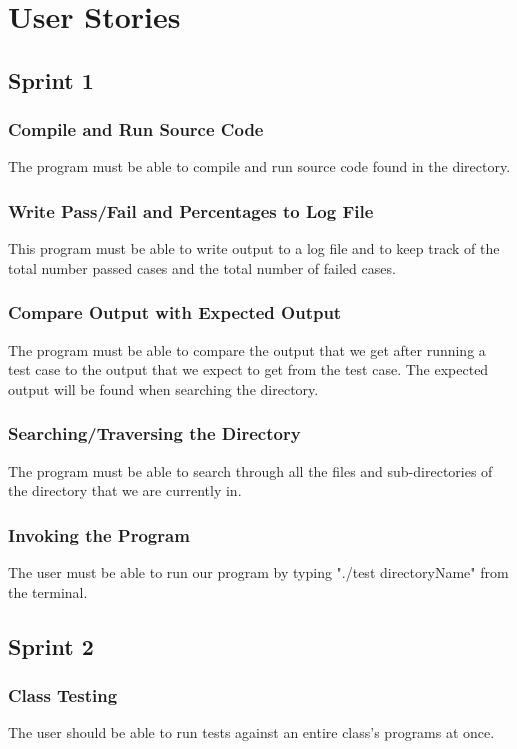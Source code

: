 \section{User Stories}

\subsection{Sprint 1}

\subsubsection{Compile and Run Source Code}
The program must be able to compile and run source code found in the directory.

\subsubsection{Write Pass/Fail and Percentages to Log File} 
This program must be able to write output to a log file and to keep track of the total number
passed cases and the total number of failed cases.

\subsubsection{Compare Output with Expected Output}
The program must be able to compare the output that we get after running a test case to the
output that we expect to get from the test case. The expected output will be found when 
searching the directory.

\subsubsection{Searching/Traversing the Directory}
The program must be able to search through all the files and sub-directories of the directory 
that we are currently in.

\subsubsection{Invoking the Program}
The user must be able to run our program by typing "./test directoryName" from the terminal.

\subsection{Sprint 2}

\subsubsection{Class Testing}
The user should be able to run tests against an entire class's programs at once.

